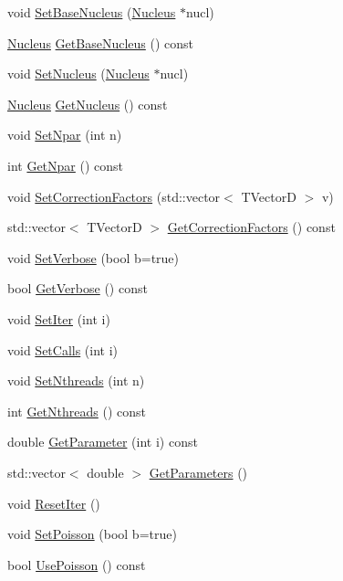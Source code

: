 \begin{DoxyCompactItemize}
\item 
void \hyperlink{classCoulExMinFCN_a3924912b5a05cb7966a569e11a6ab912}{Set\-Base\-Nucleus} (\hyperlink{classNucleus}{Nucleus} $\ast$nucl)
\item 
\hyperlink{classNucleus}{Nucleus} \hyperlink{classCoulExMinFCN_aca08dec223253bd86022ebf5358d837a}{Get\-Base\-Nucleus} () const 
\item 
void \hyperlink{classCoulExMinFCN_a4154d0ca6197aff0c360a18b846718bf}{Set\-Nucleus} (\hyperlink{classNucleus}{Nucleus} $\ast$nucl)
\item 
\hyperlink{classNucleus}{Nucleus} \hyperlink{classCoulExMinFCN_a04819cb7504e0d38a530923c3a9cdb87}{Get\-Nucleus} () const 
\item 
void \hyperlink{classCoulExMinFCN_aa7a93d1dbdf39271e8e7f1aedbbda147}{Set\-Npar} (int n)
\item 
int \hyperlink{classCoulExMinFCN_a558a013938717c422f66a9a955d78662}{Get\-Npar} () const 
\item 
void \hyperlink{classCoulExMinFCN_a6525e186ee14702162701414cda80fe1}{Set\-Correction\-Factors} (std\-::vector$<$ T\-Vector\-D $>$ v)
\item 
std\-::vector$<$ T\-Vector\-D $>$ \hyperlink{classCoulExMinFCN_a457c6cf81ad161d18c13e8bacd087a4a}{Get\-Correction\-Factors} () const 
\item 
void \hyperlink{classCoulExMinFCN_a04926d8c95503585735f0f79337376d1}{Set\-Verbose} (bool b=true)
\item 
bool \hyperlink{classCoulExMinFCN_acac974995031dd144882caee327f0284}{Get\-Verbose} () const 
\item 
void \hyperlink{classCoulExMinFCN_a4b5d3d75267cc59035d6697fceb3e8d3}{Set\-Iter} (int i)
\item 
void \hyperlink{classCoulExMinFCN_a70d61db9a8a7fee17671b637b3c0dee7}{Set\-Calls} (int i)
\item 
void \hyperlink{classCoulExMinFCN_a8fd85057cc72d10486ea25de6d37aa3d}{Set\-Nthreads} (int n)
\item 
int \hyperlink{classCoulExMinFCN_aee492209717d0c852ce0093a8f45b1d9}{Get\-Nthreads} () const 
\item 
double \hyperlink{classCoulExMinFCN_aa588591bbc923ab42070b42b74c1dfc8}{Get\-Parameter} (int i) const 
\item 
std\-::vector$<$ double $>$ \hyperlink{classCoulExMinFCN_ac49f8e36a62aac46b1300eca173f486f}{Get\-Parameters} ()
\item 
void \hyperlink{classCoulExMinFCN_ad15983e7cecf6fb939c55d47b2a9e700}{Reset\-Iter} ()
\item 
void \hyperlink{classCoulExMinFCN_a96c96926312d6e52c797274035410894}{Set\-Poisson} (bool b=true)
\item 
bool \hyperlink{classCoulExMinFCN_a076212903b18324a472ef11310bf8fc3}{Use\-Poisson} () const 
\end{DoxyCompactItemize}


